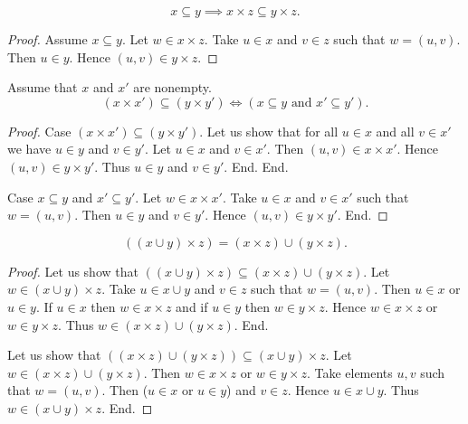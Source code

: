 \documentclass[../../set-theory.ftl.tex]{subfiles}
\begin{document}
  \begin{forthel}
    \begin{proposition}\label{SetTheory_01_06_197314}
      \[ x \subseteq y \implies x \times z \subseteq y \times z. \]
    \end{proposition}
    \begin{proof}
      Assume $x \subseteq y$.
      Let $w \in x \times z$.
      Take $u \in x$ and $v \in z$ such that $w = (u,v)$.
      Then $u \in y$.
      Hence $(u,v) \in y \times z$.
    \end{proof}

    \begin{proposition}\label{SetTheory_01_06_238807}
      Assume that $x$ and $x'$ are nonempty.
      \[ (x \times x') \subseteq (y \times y') \iff (\text{$x \subseteq y$ and $x' \subseteq y'$}). \]
    \end{proposition}
    \begin{proof}
      Case $(x \times x') \subseteq (y \times y')$.
        Let us show that for all $u \in x$ and all $v \in x'$ we have $u \in y$ and $v \in y'$.
          Let $u \in x$ and $v \in x'$.
          Then $(u,v) \in x \times x'$.
          Hence $(u,v) \in y \times y'$.
          Thus $u \in y$ and $v \in y'$.
        End.
      End.

      Case $x \subseteq y$ and $x' \subseteq y'$.
        Let $w \in x \times x'$.
        Take $u \in x$ and $v \in x'$ such that $w = (u,v)$.
        Then $u \in y$ and $v \in y'$.
        Hence $(u,v) \in y \times y'$.
      End.
    \end{proof}

    \begin{proposition}\label{SetTheory_01_06_138531}
      \[ ((x \cup y) \times z) = (x \times z) \cup (y \times z). \]
    \end{proposition}
    \begin{proof}
      Let us show that $((x \cup y) \times z) \subseteq (x \times z) \cup (y \times z).$
        Let $w \in (x \cup y) \times z$.
        Take $u \in x \cup y$ and $v \in z$ such that $w = (u,v)$.
        Then $u \in x$ or $u \in y$.
        If $u \in x$ then $w \in x \times z$ and if $u \in y$ then $w \in y \times z$.
        Hence $w \in x \times z$ or $w \in y \times z$.
        Thus $w \in (x \times z) \cup (y \times z)$.
      End.

      Let us show that $((x \times z) \cup (y \times z)) \subseteq (x \cup y) \times z$.
        Let $w \in (x \times z) \cup (y \times z)$.
        Then $w \in x \times z$ or $w \in y \times z$.
        Take elements $u,v$ such that $w = (u,v)$.
        Then ($u \in x$ or $u \in y$) and $v \in z$.
        Hence $u \in x \cup y$.
        Thus $w \in (x \cup y) \times z$.
      End.
    \end{proof}


\end{forthel}
\end{document}
